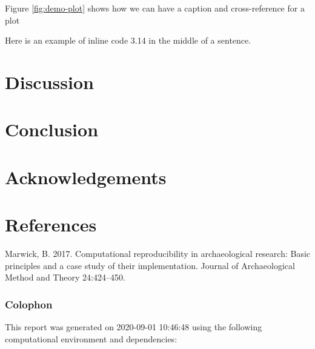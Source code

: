 \documentclass[
]{article}
\begin{document}
Figure \ref{fig:demo-plot} shows how we can have a caption and cross-reference for a plot

Here is an example of inline code 3.14 in the middle of a sentence.

\hypertarget{discussion}{%
\section{Discussion}\label{discussion}}

\hypertarget{conclusion}{%
\section{Conclusion}\label{conclusion}}

\hypertarget{acknowledgements}{%
\section{Acknowledgements}\label{acknowledgements}}

\newpage

\hypertarget{references}{%
\section{References}\label{references}}

\hypertarget{refs}{}
\leavevmode\hypertarget{ref-Marwick2017}{}%
Marwick, B. 2017. Computational reproducibility in archaeological research: Basic principles and a case study of their implementation. Journal of Archaeological Method and Theory 24:424--450.

\newpage

\hypertarget{colophon}{%
\subsubsection{Colophon}\label{colophon}}

This report was generated on 2020-09-01 10:46:48 using the following computational environment and dependencies:
\end{document}
